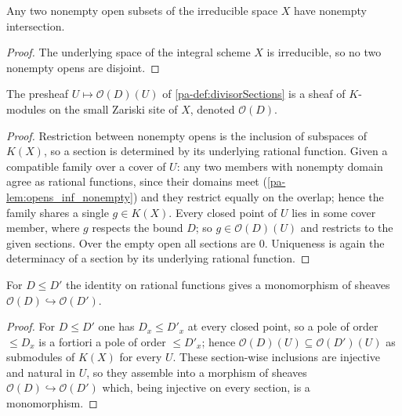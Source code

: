 \begin{lemma}
  \label{pa-lem:opens_inf_nonempty}
  \leanok

  Any two nonempty open subsets of the irreducible space \(X\) have nonempty intersection.
\end{lemma}
\begin{proof}
  \leanok
  The underlying space of the integral scheme \(X\) is irreducible, so no two nonempty opens are
  disjoint.
\end{proof}

\begin{definition}
  \label{pa-def:divisorSheaf}
  \leanok

  The presheaf \(U \mapsto \mathcal O(D)(U)\) of \ref{pa-def:divisorSections} is a sheaf of
  \(K\)-modules on the small Zariski site of \(X\), denoted \(\mathcal O(D)\).
\end{definition}
\begin{proof}
  \leanok
  Restriction between nonempty opens is the inclusion of subspaces of \(K(X)\), so a section is
  determined by its underlying rational function. Given a compatible family over a cover of \(U\):
  any two members with nonempty domain agree as rational functions, since their domains meet
  (\ref{pa-lem:opens_inf_nonempty}) and they restrict equally on the overlap; hence the family shares a
  single \(g \in K(X)\). Every closed point of \(U\) lies in some cover member, where \(g\) respects
  the bound \(D\); so \(g \in \mathcal O(D)(U)\) and restricts to the given sections. Over the empty
  open all sections are \(0\). Uniqueness is again the determinacy of a section by its underlying
  rational function.
\end{proof}

\begin{theorem}
  \label{pa-thm:divisorSheafLE}
  \leanok

  For \(D \le D'\) the identity on rational functions gives a monomorphism of sheaves
  \(\mathcal O(D) \hookrightarrow \mathcal O(D')\).
\end{theorem}
\begin{proof}
  \leanok
  For \(D \le D'\) one has \(D_x \le D'_x\) at every closed point, so a pole of order \(\le D_x\) is
  a fortiori a pole of order \(\le D'_x\); hence \(\mathcal O(D)(U) \subseteq \mathcal O(D')(U)\) as
  submodules of \(K(X)\) for every \(U\). These section-wise inclusions are injective and natural in
  \(U\), so they assemble into a morphism of sheaves \(\mathcal O(D) \hookrightarrow \mathcal O(D')\)
  which, being injective on every section, is a monomorphism.
\end{proof}


